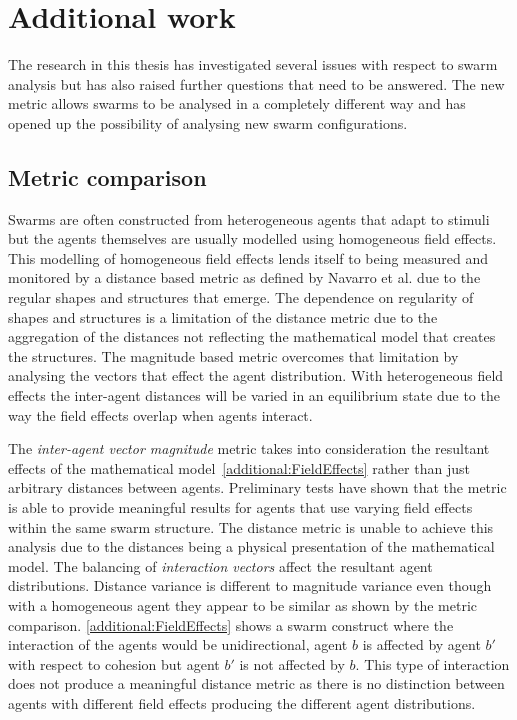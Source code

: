 \section{Additional work}\label{additional:MoreWork}
The research in this thesis has investigated several issues with respect to swarm analysis but has also raised further questions that need to be answered. The new metric allows swarms to be analysed in a completely different way and has opened up the possibility of analysing new swarm configurations.

\subsection{Metric comparison}\label{additional:fieldsWork}
Swarms are often constructed from heterogeneous agents that adapt to stimuli but the agents themselves are usually modelled using homogeneous field effects. This modelling of homogeneous field effects lends itself to being measured and monitored by a distance based metric as defined by Navarro et al. \cite{NIM:09} due to the regular shapes and structures that emerge. The dependence on regularity of shapes and structures is a limitation of the distance metric due to the aggregation of the distances not reflecting the mathematical model that creates the structures. The magnitude based metric overcomes that limitation by analysing the vectors that effect the agent distribution. With heterogeneous field effects the inter-agent distances will be varied in an equilibrium state due to the way the field effects overlap when agents interact. 

The \textit{inter-agent vector magnitude} metric takes into consideration the resultant effects of the mathematical model~\autoref{additional:FieldEffects} rather than just arbitrary distances between agents. Preliminary tests have shown that the metric is able to provide meaningful results for agents that use varying field effects within the same swarm structure. The distance metric is unable to achieve this analysis due to the distances being a physical presentation of the mathematical model. The balancing of \textit{interaction vectors} affect the resultant agent distributions. Distance variance is different to magnitude variance even though with a homogeneous agent they appear to be similar as shown by the metric comparison. \autoref{additional:FieldEffects} shows a swarm construct where the interaction of the agents would be unidirectional, agent $b$ is affected by agent $b'$ with respect to cohesion but agent $b'$ is not affected by $b$. This type of interaction does not produce a meaningful distance metric as there is no distinction between agents with different field effects producing the different agent distributions.  

